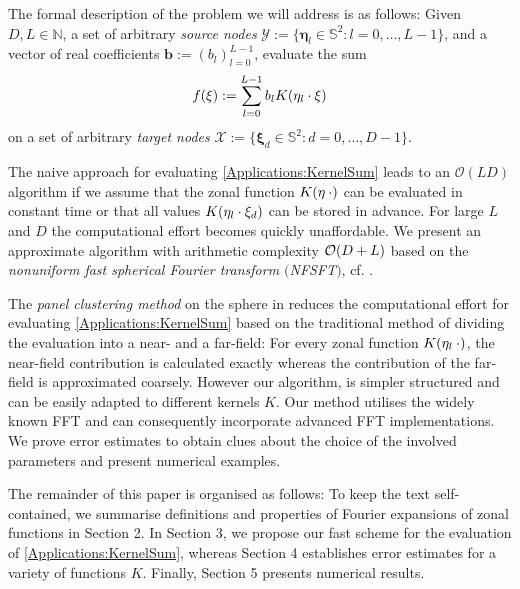 \documentclass[11pt,a4paper,twoside,bibtotoc]{scrartcl}
\theoremstyle{plain}
\theoremstyle{definition}
\theoremstyle{remark}
\newcommand{\N}{\ensuremath{\mathbb{N}}}
\newcommand{\fun}[2]{\ensuremath{#1{\hspace{-0.4ex}}\left(#2\right)}}
\numberwithin{equation}{section}
\numberwithin{table}{section}
\numberwithin{figure}{section}
\begin{document}
The formal description of the problem we will address is as follows:
Given $D,L \in \N$, a set of arbitrary \emph{source nodes} $\mathcal{Y} :=
\{\mathbf{\eta}_{l} \in \mathbb{S}^2: l = 0,\ldots,L-1\}$, and a vector of
real coefficients $\mathbf{b}:=(b_{l})_{l=0}^{L-1}$, evaluate the sum
\begin{equation}
  \label{Applications:KernelSum}
  \fun{f}{\mathbf{\xi}} := \sum_{l = 0}^{L-1} b_{l} \fun{K}{\mathbf{\eta}_{l} \cdot \mathbf{\xi}}
\end{equation}
on a set of arbitrary \emph{target nodes} $\mathcal{X} := \{\mathbf{\xi}_{d}
  \in \mathbb{S}^2: d=0,\ldots,D-1\}$.

The naive approach for evaluating \eqref{Applications:KernelSum} leads to
an $\mathcal{O}\left(LD\right)$ algorithm if we assume that the zonal function
$\fun{K}{\mathbf{\eta} \: \cdot}$ can be evaluated in constant time or that all values
$\fun{K}{\mathbf{\eta}_{l} \cdot \mathbf{\xi}_{d}}$ can be stored in advance. 
For large $L$ and $D$ the computational effort becomes quickly unaffordable.
We present an approximate algorithm with arithmetic complexity 
${\cal O} (D+L)$ based on the \emph{nonuniform fast spherical Fourier 
transform $($NFSFT$)$}, cf. \cite{kupo02,keiner05}. 

The \emph{panel clustering method} on the sphere in \cite{FrGlSch98}
reduces the 
computational effort for evaluating \eqref{Applications:KernelSum} based on the
traditional method of dividing the evaluation into a near- and a far-field:
For every zonal function $\fun{K}{\mathbf{\eta}_l \: \cdot}$, the near-field
contribution is calculated exactly whereas the contribution of the far-field
is approximated coarsely. However our  algorithm, is simpler structured 
and can be easily adapted to different kernels $K$.
Our method utilises the widely known FFT and can consequently incorporate
advanced FFT implementations.
We prove error estimates to obtain clues about the choice of the
involved parameters and present numerical examples.

The remainder of this paper is organised as follows:
To keep the text self-contained, we summarise definitions and properties
of Fourier expansions of zonal functions in Section 2.
In Section 3, we propose our fast scheme for the evaluation of
\eqref{Applications:KernelSum}, whereas Section 4 establishes
error estimates for a variety of functions $K$.
Finally, Section 5 presents numerical results.

\end{document}
